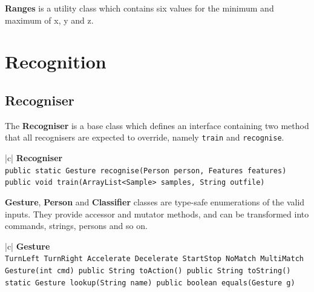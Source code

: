 \documentclass[12pt,a4,notitlepage]{report}
\renewcommand{\_}{\texttt{\symbol{95}}}
\newcommand{\<}{\texttt{\symbol{60}}}
\renewcommand{\>}{\texttt{\symbol{62}}}
\newcommand{\class}[1]{\textbf{#1}}
\newcommand{\variable}[1]{\texttt{#1}}
\begin{document}
\class{Ranges} is a utility class which contains six values for the minimum and maximum of x, y and z.  

\section{Recognition}

\subsection{Recogniser}

The \class{Recogniser} is a base class which defines an interface containing two method that all recognisers are expected to override, namely \variable{train} and \variable{recognise}.

\begin{tabular}{|c|} \hline 
\class{Recogniser} \\ \hline
{}
{\variable{public static Gesture recognise(Person person, Features features) \newline
public void train(ArrayList<Sample> samples, String out\_file)
 } } \\
\hline
\end{tabular}

\class{Gesture}, \class{Person} and \class{Classifier} classes are type-safe enumerations of the valid inputs. They provide accessor and mutator methods, and can be transformed into commands, strings, persons and so on.

\begin{tabular}{|c|} \hline 
\class{Gesture} \\ \hline
{}
{\variable{TurnLeft \newline TurnRight \newline Accelerate \newline Decelerate \newline StartStop \newline NoMatch \newline MultiMatch \newline
Gesture(int cmd) \newline
public String toAction() \newline
public String toString() \newline
static Gesture lookup(String name) \newline
public boolean equals(Gesture g)
} } \\ \hline
\end{tabular}
\end{document}
